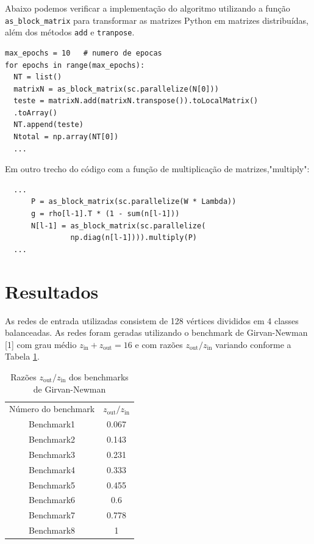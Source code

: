\documentclass[conference]{IEEEtran}
\begin{document}
Abaixo podemos verificar a implementação do algoritmo utilizando a função \texttt{as\_block\_matrix} para transformar as matrizes Python em matrizes distribuídas, além dos métodos \texttt{add} e \texttt{tranpose}.

\lstset{language=Python}
\lstset{frame=lines}
\lstset{basicstyle=\footnotesize}
\begin{lstlisting}
max_epochs = 10   # numero de epocas
for epochs in range(max_epochs):
  NT = list()
  matrixN = as_block_matrix(sc.parallelize(N[0]))
  teste = matrixN.add(matrixN.transpose()).toLocalMatrix()
  .toArray()
  NT.append(teste)
  Ntotal = np.array(NT[0]) 
  ...

\end{lstlisting}

Em outro trecho do código com a função de multiplicação de matrizes,"multiply": 

\lstset{language=Python}
\lstset{frame=lines}
\lstset{basicstyle=\footnotesize}
\begin{lstlisting}
  ...
      P = as_block_matrix(sc.parallelize(W * Lambda))
      g = rho[l-1].T * (1 - sum(n[l-1]))
      N[l-1] = as_block_matrix(sc.parallelize(
               np.diag(n[l-1]))).multiply(P)
  ...

\end{lstlisting}



\section{Resultados}\label{AA}

 As redes de entrada utilizadas consistem de 128 vértices divididos em 4 classes balanceadas.  As redes foram geradas utilizando o benchmark de Girvan-Newman [1] com grau médio $z_\text{in} + z_\text{out} = 16$ e com razões $z_\text{out}/z_\text{in}$ variando conforme a Tabela \ref{tab:benchmark}.

\begin{table}[h!]
\centering
\caption{Razões $z_\text{out}/z_\text{in}$ dos benchmarks de Girvan-Newman}
\label{tab:benchmark}
\begin{tabular}{c c}
Número do benchmark & $z_{\text{out}}/z_{\text{in}}$ \\
Benchmark1 & 0.067 \\
Benchmark2 & 0.143\\
Benchmark3 & 0.231\\
Benchmark4 & 0.333  \\
Benchmark5 & 0.455  \\           
Benchmark6 & 0.6  \\ 
Benchmark7 & 0.778 \\ 
Benchmark8 & 1
\end{tabular}
\end{table}
\end{document}
